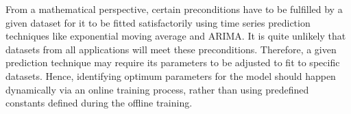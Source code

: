 From a mathematical perspective, certain preconditions have to be fulfilled by a given dataset for it to be fitted satisfactorily using time series prediction techniques like exponential moving average and ARIMA. It is quite unlikely that datasets from all applications will meet these preconditions. Therefore, a given prediction technique may require its parameters to be adjusted to fit to specific datasets. Hence, identifying optimum parameters for the model should happen dynamically via an online training process, rather than using predefined constants defined during the offline training.